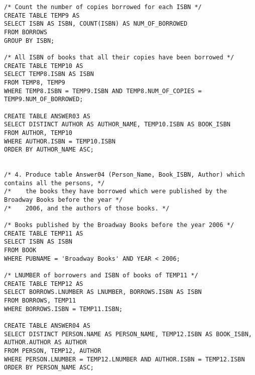 \documentclass[10pt]{article}
\begin{document}
\begin{verbatim}
/* Count the number of copies borrowed for each ISBN */
CREATE TABLE TEMP9 AS
SELECT ISBN AS ISBN, COUNT(ISBN) AS NUM_OF_BORROWED
FROM BORROWS
GROUP BY ISBN;

/* All ISBN of books that all their copies have been borrowed */
CREATE TABLE TEMP10 AS
SELECT TEMP8.ISBN AS ISBN
FROM TEMP8, TEMP9
WHERE TEMP8.ISBN = TEMP9.ISBN AND TEMP8.NUM_OF_COPIES = TEMP9.NUM_OF_BORROWED;

CREATE TABLE ANSWER03 AS
SELECT DISTINCT AUTHOR AS AUTHOR_NAME, TEMP10.ISBN AS BOOK_ISBN
FROM AUTHOR, TEMP10
WHERE AUTHOR.ISBN = TEMP10.ISBN
ORDER BY AUTHOR_NAME ASC;


/* 4. Produce table Answer04 (Person_Name, Book_ISBN, Author) which contains all the persons, */
/*    the books they have borrowed which were published by the Broadway Books before the year */
/*    2006, and the authors of those books. */

/* Books published by the Broadway Books before the year 2006 */
CREATE TABLE TEMP11 AS
SELECT ISBN AS ISBN
FROM BOOK
WHERE PUBNAME = 'Broadway Books' AND YEAR < 2006;

/* LNUMBER of borrowers and ISBN of books of TEMP11 */
CREATE TABLE TEMP12 AS
SELECT BORROWS.LNUMBER AS LNUMBER, BORROWS.ISBN AS ISBN
FROM BORROWS, TEMP11
WHERE BORROWS.ISBN = TEMP11.ISBN;

CREATE TABLE ANSWER04 AS
SELECT DISTINCT PERSON.NAME AS PERSON_NAME, TEMP12.ISBN AS BOOK_ISBN, AUTHOR.AUTHOR AS AUTHOR
FROM PERSON, TEMP12, AUTHOR
WHERE PERSON.LNUMBER = TEMP12.LNUMBER AND AUTHOR.ISBN = TEMP12.ISBN
ORDER BY PERSON_NAME ASC;
\end{verbatim}
\end{document}
